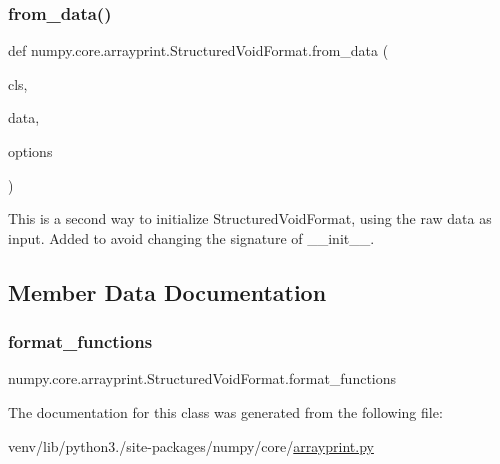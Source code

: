 \mbox{\label{classnumpy_1_1core_1_1arrayprint_1_1StructuredVoidFormat_a501a75770e1affb2ad42095a8a79f686}} 
\subsubsection{\texorpdfstring{from\+\_\+data()}{from\_data()}}
{\footnotesize\ttfamily def numpy.\+core.\+arrayprint.\+Structured\+Void\+Format.\+from\+\_\+data (\begin{DoxyParamCaption}\item[{}]{cls,  }\item[{}]{data,  }\item[{}]{options }\end{DoxyParamCaption})}

\begin{DoxyVerb}This is a second way to initialize StructuredVoidFormat, using the raw data
as input. Added to avoid changing the signature of __init__.
\end{DoxyVerb}
 

\subsection{Member Data Documentation}
\mbox{\label{classnumpy_1_1core_1_1arrayprint_1_1StructuredVoidFormat_ae081c531a2c64300a85f166857f59385}} 
\subsubsection{\texorpdfstring{format\+\_\+functions}{format\_functions}}
{\footnotesize\ttfamily numpy.\+core.\+arrayprint.\+Structured\+Void\+Format.\+format\+\_\+functions}



The documentation for this class was generated from the following file\+:\begin{DoxyCompactItemize}
\item 
venv/lib/python3./site-\/packages/numpy/core/\hyperlink{core_2arrayprint_8py}{arrayprint.\+py}\end{DoxyCompactItemize}
